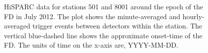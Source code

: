 \begin{figure}[ht!]
	\centering
	
	\caption{HiSPARC data for stations 501 and 8001 around the epoch of the FD in July 2012. The plot shows the minute-averaged and hourly-averaged trigger events between detectors within the station. The vertical blue-dashed line shows the approximate onset-time of the FD. The units of time on the x-axis are, YYYY-MM-DD.}
	\label{fig:FD_201207}
\end{figure}

